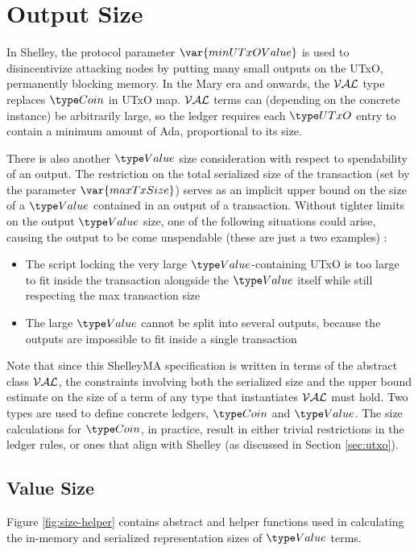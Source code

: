 \section{Output Size}
\label{sec:value-size}

In Shelley, the protocol parameter $\var{minUTxOValue}$ is used to
disincentivize attacking nodes by putting many small outputs on the
UTxO, permanently blocking memory. In the Mary era
and onwards, the $\mathcal{VAL}$ type replaces $\Coin$ in UTxO map. $\mathcal{VAL}$ terms
can (depending on the concrete instance) be arbitrarily large, so the ledger requires each $\UTxO$ entry to
contain a minimum amount of Ada, proportional to its size.

There is also another $\Value$ size consideration with respect to spendability
of an output. The restriction on the total serialized size of the transaction (set
by the parameter $\var{maxTxSize}$) serves as an implicit upper bound on the
size of a $\Value$ contained in an output of a transaction. Without tighter
limits on the output $\Value$ size, one of the following situations could arise,
causing the output to be come unspendable (these are just a two examples) :

\begin{itemize}
  \item The script locking the very large $\Value$-containing UTxO is too large
  to fit inside the transaction alongside the $\Value$ itself while still respecting
  the max transaction size
  \item The large $\Value$ cannot be split into several outputs, because the
  outputs are impossible to fit inside a single transaction
\end{itemize}

Note that since this ShelleyMA specification is written in terms of the abstract
class $\mathcal{VAL}$, the constraints involving both the serialized size and the upper bound estimate
on the size of a term of any type that instantiates $\mathcal{VAL}$ must hold.
Two types are used to define concrete ledgers, $\Coin$ and $\Value$.
The size calculations for $\Coin$, in practice,
result in either trivial restrictions in the ledger rules,
or ones that align with Shelley (as discussed in Section \ref{sec:utxo}).

\subsection{Value Size}

Figure \ref{fig:size-helper} contains abstract and helper functions
used in calculating the in-memory and serialized representation
sizes of $\Value$ terms.

